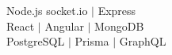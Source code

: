 Node.js socket.io $|$ Express \\
React $|$ Angular $|$ MongoDB \\
PostgreSQL $|$ Prisma $|$ GraphQL 